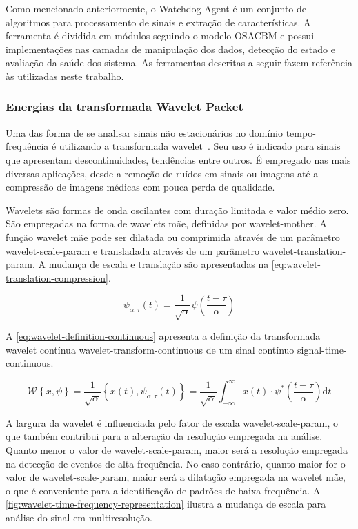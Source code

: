 Como mencionado anteriormente, o Watchdog Agent é um conjunto de algoritmos para processamento de
sinais e extração de características. A ferramenta é dividida em módulos seguindo o modelo
\gls{OSACBM} e possui implementações nas camadas de manipulação dos dados, detecção do estado e
avaliação da saúde dos sistema. As ferramentas descritas a seguir fazem referência às utilizadas
neste trabalho.


\subsubsection{Energias da transformada Wavelet Packet}

Uma das forma de se analisar sinais não estacionários no domínio tempo-frequência é utilizando a
transformada wavelet~\cite{antonini1992image}. Seu uso é indicado para sinais que apresentam
descontinuidades, tendências entre outros. É empregado nas mais diversas aplicações, desde a remoção
de ruídos em sinais ou imagens até a compressão de imagens médicas com pouca perda de qualidade.

Wavelets são formas de onda oscilantes com duração limitada e valor médio zero. São empregadas na
forma de wavelets mãe, definidas por \gls{wavelet-mother}. A função wavelet mãe pode ser dilatada ou
comprimida através de um parâmetro \gls{wavelet-scale-param} e transladada através de um
parâmetro \gls{wavelet-translation-param}. A mudança de escala e translação são apresentadas na
\cref{eq:wavelet-translation-compression}.

\begin{equation}
  \psi_{\alpha, \tau}(t) = \frac{1}{\sqrt{\alpha}} \psi \left ( \frac{t - \tau}{\alpha} \right )
  \label{eq:wavelet-translation-compression}
\end{equation}

A \cref{eq:wavelet-definition-continuous} apresenta a definição da transformada wavelet contínua
\gls{wavelet-transform-continuous} de um sinal contínuo \gls{signal-time-continuous}.

\begin{equation}
  \mathcal{W} \left \{ x, \psi \right \} =
      \frac{1}{\sqrt{\alpha}} \left \{ x(t), \psi_{\alpha, \tau}(t) \right \} =
      \frac{1}{\sqrt{\alpha}} \int_{-\infty}^{\infty} x(t) \cdot
        \psi^{*} \left ( \frac{t - \tau}{\alpha} \right ) \textrm{d}t
  \label{eq:wavelet-definition-continuous}
\end{equation}

A largura da wavelet é influenciada pelo fator de escala \gls{wavelet-scale-param}, o que também
contribui para a alteração da resolução empregada na análise. Quanto menor o valor de
\gls{wavelet-scale-param}, maior será a resolução empregada na detecção de eventos de alta
frequência. No caso contrário, quanto maior for o valor de \gls{wavelet-scale-param}, maior será a
dilatação empregada na wavelet mãe, o que é conveniente para a identificação de padrões de baixa
frequência. A \cref{fig:wavelet-time-frequency-representation} ilustra a mudança de escala para
análise do sinal em multiresolução.

